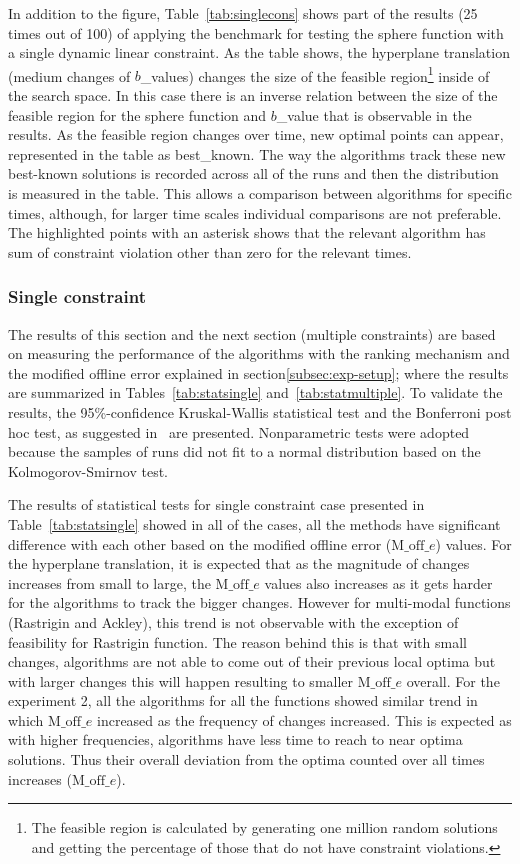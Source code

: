\documentclass[conference]{IEEEtran}
\begin{document}
In addition to the figure, Table~\ref{tab:singlecons} shows part of the results (25 times out of 100) of applying the benchmark for testing the sphere function with a single dynamic linear constraint. As the table shows, the hyperplane translation (medium changes of $b$\_values) changes the size of the feasible region\footnote{The feasible region is calculated by generating one million random solutions and getting the percentage of those that do not have constraint violations.} inside of the search space. In this case there is an inverse relation between the size of the feasible region for the sphere function and $b$\_value that is observable in the results. As the feasible region changes over time, new optimal points can appear, represented in the table as best\_known. The way the algorithms track these new best-known solutions is recorded across all of the runs and then the distribution is measured in the table. This allows a comparison between algorithms for specific times, although, for larger time scales individual comparisons are not preferable. The highlighted points with an asterisk shows that the relevant algorithm has sum of constraint violation other than zero for the relevant times.

\subsubsection{Single constraint}
The results of this section and the next section (multiple constraints) are based on measuring the performance of the algorithms with the ranking mechanism and the modified offline error explained in section\ref{subsec:exp-setup}; where the results are summarized in Tables~\ref{tab:statsingle} and~\ref{tab:statmultiple}. To validate the results, the 95\%-confidence Kruskal-Wallis statistical test and the Bonferroni post hoc test, as suggested in~\cite{Derrac20113} are presented. Nonparametric tests were adopted because the samples of runs did not fit to a normal distribution based on the Kolmogorov-Smirnov test.

The results of statistical tests for single constraint case presented in Table~\ref{tab:statsingle} showed in all of the cases, all the methods have significant difference with each other based on the modified offline error ($\text{M\_off}\_e$) values.  
For the hyperplane translation, it is expected that as the magnitude of changes increases from small to large, the $\text{M\_off}\_e$ values also increases as it gets harder for the algorithms to track the bigger changes. However for multi-modal functions (Rastrigin and Ackley), this trend is not observable with the exception of feasibility for Rastrigin function. The reason behind this is that with small changes, algorithms are not able to come out of their previous local optima but with larger changes this will happen resulting to smaller $\text{M\_off}\_e$ overall.
For the experiment 2, all the algorithms for all the functions showed similar trend in which $\text{M\_off}\_e$ increased as the frequency of changes increased. This is expected as with higher frequencies, algorithms have less time to reach to near optima solutions. Thus their overall deviation from the optima counted over all times increases ($\text{M\_off}\_e$).
\end{document}
